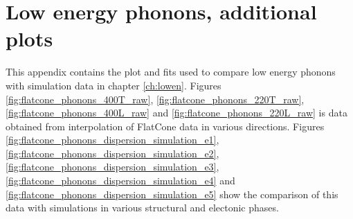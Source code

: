 
    
    
    
    
    

\chapter{Low energy phonons, additional plots}\label{app:lowen_plots}
This appendix contains the plot and fits used to compare low energy phonons with simulation data in chapter \ref{ch:lowen}. Figures \ref{fig:flatcone_phonons_400T_raw}, \ref{fig:flatcone_phonons_220T_raw}, \ref{fig:flatcone_phonons_400L_raw} and \ref{fig:flatcone_phonons_220L_raw} is data obtained from interpolation of FlatCone data in various directions. Figures \ref{fig:flatcone_phonons_dispersion_simulation_e1}, \ref{fig:flatcone_phonons_dispersion_simulation_e2}, \ref{fig:flatcone_phonons_dispersion_simulation_e3}, \ref{fig:flatcone_phonons_dispersion_simulation_e4} and \ref{fig:flatcone_phonons_dispersion_simulation_e5} show the comparison of this data with simulations in various structural and electonic phases.

